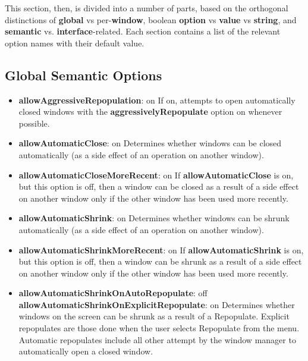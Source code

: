 This section, then, is divided into a number of parts, based on the
orthogonal distinctions of {\bf global} vs per-{\bf window}, boolean
{\bf option} vs {\bf value} vs {\bf string}, and {\bf semantic} vs.
{\bf interface}-related.
Each section contains a list of the relevant option names with their
default value.

\subsection{Global Semantic Options}

\begin{itemize}
\item {\bf allowAggressiveRepopulation}: on\newline{}
If on, attempts to open automatically closed windows with the
{\bf aggressivelyRepopulate} option on whenever possible.

\item {\bf allowAutomaticClose}: on\newline{}
Determines whether windows can be closed automatically (as a side
effect of an operation on another window).

\item {\bf allowAutomaticCloseMoreRecent}: on\newline{}
If {\bf allowAutomaticClose} is on, but this option is off, then a
window can be closed as a result of a side effect on another
window only if the other window has been used more recently.

\item {\bf allowAutomaticShrink}: on\newline{}
Determines whether windows can be shrunk automatically (as a side
effect of an operation on another window).

\item {\bf allowAutomaticShrinkMoreRecent}: on\newline{}
If {\bf allowAutomaticShrink} is on, but this option is off, then a
window can be shrunk as a result of a side effect on another
window only if the other window has been used more recently.

\item {\bf allowAutomaticShrinkOnAutoRepopulate}: off\newline{}
{\bf allowAutomaticShrinkOnExplicitRepopulate}: on\newline{}
Determines whether windows on the screen can be shrunk as a
result of a Repopulate.  Explicit repopulates are those
done when the user selects Repopulate from the menu.
Automatic repopulates include all other
attempt by the window manager to automatically open a closed window.


\end{itemize}
